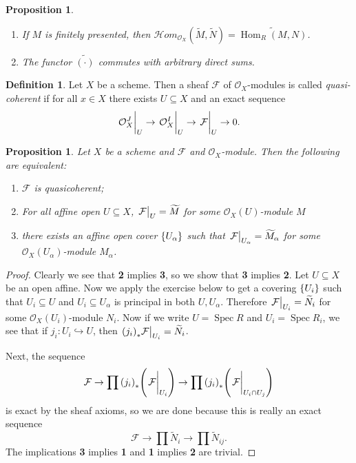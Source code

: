 \documentclass[leqno, openany]{memoir}
\newtheorem{prop}[thm]{Proposition}
\theoremstyle{definition}
\newtheorem{defn}[thm]{Definition}
\theoremstyle{remark}
\theoremstyle{plain}
\theoremstyle{definition}
\theoremstyle{remark}
\newcommand{\mc}[1]{\mathcal{#1}}
\newcommand{\wt}[1]{\widetilde{#1}}
\DeclareMathOperator{\Hom}{Hom}
\DeclareMathOperator{\Spec}{Spec}
\begin{document}
\begin{prop}\leavevmode
    \begin{enumerate}
        \item If $M$ is finitely presented, then $\mc{H}om_{\mc{O}_X}(\wt{M}, \wt{N}) = \wt{\Hom_R(M, N)}$.
        \item The functor $\wt{(\cdot )}$ commutes with arbitrary direct sums.
    \end{enumerate}
\end{prop}

\begin{defn}
    Let $X$ be a scheme. Then a sheaf $\mc{F}$ of $\mc{O}_X$-modules is called \textit{quasi-coherent} if for all $x \in X$ there exists $U \subseteq X$ and an exact sequence
    \[ \eval{\mc{O}_X^J}_U \to \eval{\mc{O}_X^I}_U \to \eval{\mc{F}}_U \to 0. \]
\end{defn}

\begin{prop}
    Let $X$ be a scheme and $\mc{F}$ and $\mc{O}_X$-module. Then the following are equivalent:
    \begin{enumerate}
        \item $\mc{F}$ is quasicoherent;
        \item For all affine open $U \subseteq X$, $\eval{\mc{F}}_U = \wt{M}$ for some $\mc{O}_X(U)$-module $M$
        \item there exists an affine open cover $\qty{U_{\alpha}}$ such that $\eval{\mc{F}}_{U_{\alpha}} = \wt{M}_{\alpha}$ for some $\mc{O}_X(U_{\alpha})$-module $M_{\alpha}$.
    \end{enumerate}
\end{prop}

\begin{proof}
    Clearly we see that \textbf{2} implies \textbf{3}, so we show that \textbf{3} implies \textbf{2}. Let $U \subseteq X$ be an open affine. Now we apply the exercise below to get a covering $\qty{U_i}$ such that $U_i \subseteq U$ and $U_i \subseteq U_{\alpha}$ is principal in both $U, U_{\alpha}$. Therefore $\eval{\mc{F}}_{U_i} = \wt{N}_i$ for some $\mc{O}_X(U_i)$-module $N_i$. Now if we write $U = \Spec R$ and $U_i = \Spec R_i$, we see that if $j_i \colon U_i \hookrightarrow U$, then $\eval{ {(j_i)}_* \mc{F} }_{U_i} = \wt{N}_i$.

    Next, the sequence
    \[ \mc{F} \to \prod {(j_i)}_* \qty(\eval{\mc{F}}_{U_i}) \to \prod {(j_i)}_* \qty(\eval{\mc{F}}_{U_i \cap U_j}) \]
    is exact by the sheaf axioms, so we are done because this is really an exact sequence
    \[ \mc{F} \to \prod \wt{N}_i \to \prod \wt{N}_{ij}. \]
    The implications \textbf{3} implies \textbf{1} and \textbf{1} implies \textbf{2} are trivial.
\end{proof}
\end{document}
